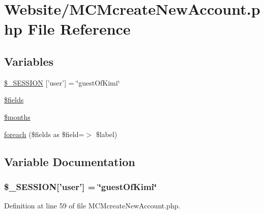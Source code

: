 \hypertarget{_m_c_mcreate_new_account_8php}{\section{Website/\-M\-C\-Mcreate\-New\-Account.php File Reference}
\label{_m_c_mcreate_new_account_8php}
}
\subsection*{Variables}
\begin{DoxyCompactItemize}
\item 
\hyperlink{_m_c_mcreate_new_account_8php_ad8419ca4a1822c7709da25d22be71556}{\$\-\_\-\-S\-E\-S\-S\-I\-O\-N} \mbox{[}'user'\mbox{]} = \char`\"{}guest\-Of\-Kimi\char`\"{}
\item 
\hyperlink{_m_c_mcreate_new_account_8php_ab2303c817e3b402b77b7f99627b9c319}{\$fields}
\item 
\hyperlink{_m_c_mcreate_new_account_8php_a88a8980708982166840708b055e335b8}{\$months}
\item 
\hyperlink{_m_c_mcreate_new_account_8php_a58d12ec81e33be9b80508ee874adb2c1}{foreach} (\$fields as \$field=$>$ \$label)
\end{DoxyCompactItemize}


\subsection{Variable Documentation}
\hypertarget{_m_c_mcreate_new_account_8php_ad8419ca4a1822c7709da25d22be71556}{
\subsubsection[{\$\-\_\-\-S\-E\-S\-S\-I\-O\-N}]{\setlength{\rightskip}{0pt plus 5cm}\$\-\_\-\-S\-E\-S\-S\-I\-O\-N\mbox{[}'user'\mbox{]} = \char`\"{}guest\-Of\-Kimi\char`\"{}}}\label{_m_c_mcreate_new_account_8php_ad8419ca4a1822c7709da25d22be71556}


Definition at line 59 of file M\-C\-Mcreate\-New\-Account.\-php.

